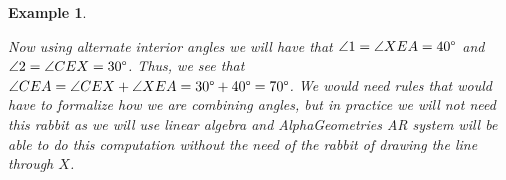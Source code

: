 \documentclass[reqno]{amsart}
\DeclareMathOperator{\1}{\textbf{1}}
\newtheorem{example}[thm]{Example}
\begin{document}
\begin{example}
\begin{center}
\end{center}
Now using alternate interior angles we will have that $\angle1 = \angle  XEA =
40\degree$ and $\angle2 = \angle CEX = 30\degree$. Thus, we see that $\angle CEA
= \angle C E X  + \angle X E A = 30\degree+40\degree = 70\degree$. We would need
rules that would have to formalize how we are combining angles, but in practice
we will not need this rabbit as we will use linear algebra and AlphaGeometries
AR system will be able to do this computation without the need of the rabbit of
drawing the line through $X$.
\end{example}
\end{document}
